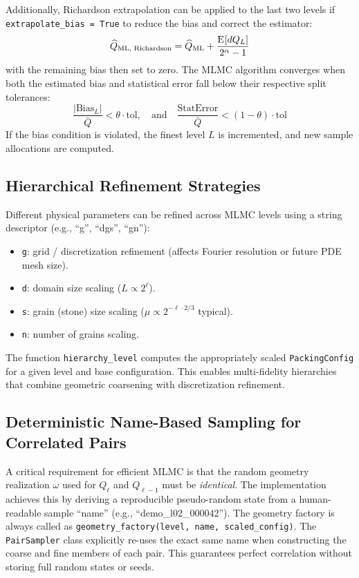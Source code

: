 \documentclass[preprint,12pt]{elsarticle}
\newcommand{\qoi}{Q}
\newcommand{\maxl}{L}
\newcommand{\weakrate}{\alpha}
\newcommand{\E}[1]{{\ensuremath{\mathrm{E}}\mspace{-2mu}\left[#1\right]}}
\begin{document}
Additionally, Richardson extrapolation can be applied to the last two levels if \texttt{extrapolate\_bias = True} to reduce the bias and correct the estimator:
\begin{equation}
\widehat{\qoi}_{\text{ML, Richardson}} = \widehat{\qoi}_{\text{ML}} + \frac{\E{d\qoi_\maxl}}{2^\weakrate - 1}
\end{equation}
with the remaining bias then set to zero. The MLMC algorithm converges when both the estimated bias and statistical error fall below their respective split tolerances:
\begin{equation}
\frac{|\text{Bias}_\maxl|}{\bar{\qoi}} < \theta \cdot \text{tol}, \quad \text{and} \quad \frac{\text{StatError}}{\bar{\qoi}} < (1 - \theta) \cdot \text{tol}
\end{equation}
If the bias condition is violated, the finest level $\maxl$ is incremented, and new sample allocations are computed.

\subsection{Hierarchical Refinement Strategies}
Different physical parameters can be refined across MLMC levels using a string descriptor (e.g., ``g'', ``dgs'', ``gn''):
\begin{itemize}
    \item \texttt{g}: grid / discretization refinement (affects Fourier resolution or future PDE mesh size).
    \item \texttt{d}: domain size scaling ($L \propto 2^\ell$).
    \item \texttt{s}: grain (stone) size scaling ($\mu \propto 2^{-\ell \cdot 2/3}$ typical).
    \item \texttt{n}: number of grains scaling.
\end{itemize}
The function \texttt{hierarchy\_level} computes the appropriately scaled \texttt{PackingConfig} for a given level and base configuration. This enables multi-fidelity hierarchies that combine geometric coarsening with discretization refinement.

\subsection{Deterministic Name-Based Sampling for Correlated Pairs}
A critical requirement for efficient MLMC is that the random geometry realization $\omega$ used for $\qoi_\ell$ and $\qoi_{\ell-1}$ must be \textit{identical}. The implementation achieves this by deriving a reproducible pseudo-random state from a human-readable sample ``name'' (e.g., ``demo\_l02\_000042''). The geometry factory is always called as \texttt{geometry\_factory(level, name, scaled\_config)}. The \texttt{PairSampler} class explicitly re-uses the exact same name when constructing the coarse and fine members of each pair. This guarantees perfect correlation without storing full random states or seeds.
\end{document}
